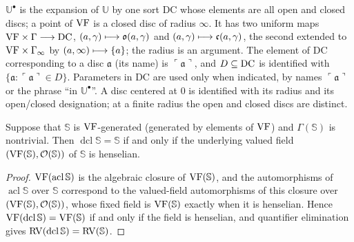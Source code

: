 \setcounter{theorem}{9}
\begin{definition}
\label{disc-exp}
\leanok
{}
$\mathbb{U}^\bullet$ is the expansion of $\mathbb{U}$ by one sort $\mathrm{DC}$ whose elements are all open and closed discs; a point of $\mathrm{VF}$ is a closed disc of radius $\infty$. It has two uniform maps $\mathrm{VF} \times \Gamma \longrightarrow \mathrm{DC}$, $(a,\gamma) \longmapsto \mathfrak{o}(a,\gamma)$ and $(a,\gamma) \longmapsto \mathfrak{c}(a,\gamma)$, the second extended to $\mathrm{VF} \times \Gamma_\infty$ by $(a,\infty) \longmapsto \{a\}$; the radius is an argument. The element of $\mathrm{DC}$ corresponding to a disc $\mathfrak{a}$ (its name) is $\ulcorner \mathfrak{a} \urcorner$, and $D \subseteq \mathrm{DC}$ is identified with $\{\mathfrak{a} : \ulcorner \mathfrak{a} \urcorner \in D\}$. Parameters in $\mathrm{DC}$ are used only when indicated, by names $\ulcorner \mathfrak{a} \urcorner$ or the phrase ``in $\mathbb{U}^\bullet$''. A disc centered at $0$ is identified with its radius and its open/closed designation; at a finite radius the open and closed discs are distinct.
\end{definition}

\setcounter{theorem}{10}
\begin{lemma}
\label{cut-to-hensel-substru}
\leanok
Suppose that $\mathbb{S}$ is $\mathrm{VF}$-generated (generated by elements of $\mathrm{VF}$) and $\Gamma(\mathbb{S})$ is nontrivial. Then $\operatorname{dcl}\mathbb{S} = \mathbb{S}$ if and only if the underlying valued field $(\mathrm{VF}(\mathbb{S}), \mathcal{O}(\mathbb{S}))$ of $\mathbb{S}$ is henselian.
\end{lemma}

\begin{proof}
\leanok
$\mathrm{VF}(\operatorname{acl}\mathbb{S})$ is the algebraic closure of $\mathrm{VF}(\mathbb{S})$, and the automorphisms of $\operatorname{acl}\mathbb{S}$ over $\mathbb{S}$ correspond to the valued-field automorphisms of this closure over $(\mathrm{VF}(\mathbb{S}), \mathcal{O}(\mathbb{S}))$, whose fixed field is $\mathrm{VF}(\mathbb{S})$ exactly when it is henselian. Hence $\mathrm{VF}(\operatorname{dcl}\mathbb{S}) = \mathrm{VF}(\mathbb{S})$ if and only if the field is henselian, and quantifier elimination gives $\mathrm{RV}(\operatorname{dcl}\mathbb{S}) = \mathrm{RV}(\mathbb{S})$.
\end{proof}

